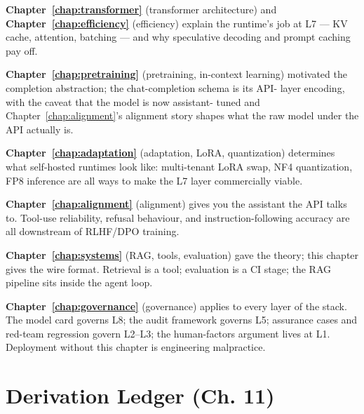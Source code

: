 \textbf{Chapter~\ref{chap:transformer}} (transformer architecture) and \textbf{Chapter~\ref{chap:efficiency}}
(efficiency) explain the runtime's job at L7 --- KV cache,
attention, batching --- and why speculative decoding and prompt
caching pay off.

\textbf{Chapter~\ref{chap:pretraining}} (pretraining, in-context learning) motivated the
completion abstraction; the chat-completion schema is its API-
layer encoding, with the caveat that the model is now assistant-
tuned and Chapter~\ref{chap:alignment}'s alignment story shapes what the raw model
under the API actually is.

\textbf{Chapter~\ref{chap:adaptation}} (adaptation, LoRA, quantization) determines what
self-hosted runtimes look like: multi-tenant LoRA swap, NF4
quantization, FP8 inference are all ways to make the L7 layer
commercially viable.

\textbf{Chapter~\ref{chap:alignment}} (alignment) gives you the assistant the API
talks to. Tool-use reliability, refusal behaviour, and
instruction-following accuracy are all downstream of RLHF/DPO
training.

\textbf{Chapter~\ref{chap:systems}} (RAG, tools, evaluation) gave the theory; this
chapter gives the wire format. Retrieval is a tool; evaluation
is a CI stage; the RAG pipeline sits inside the agent loop.

\textbf{Chapter~\ref{chap:governance}} (governance) applies to every layer of the
stack. The model card governs L8; the audit framework governs
L5; assurance cases and red-team regression govern L2--L3; the
human-factors argument lives at L1. Deployment without this
chapter is engineering malpractice.

\section*{Derivation Ledger (Ch. 11)}

